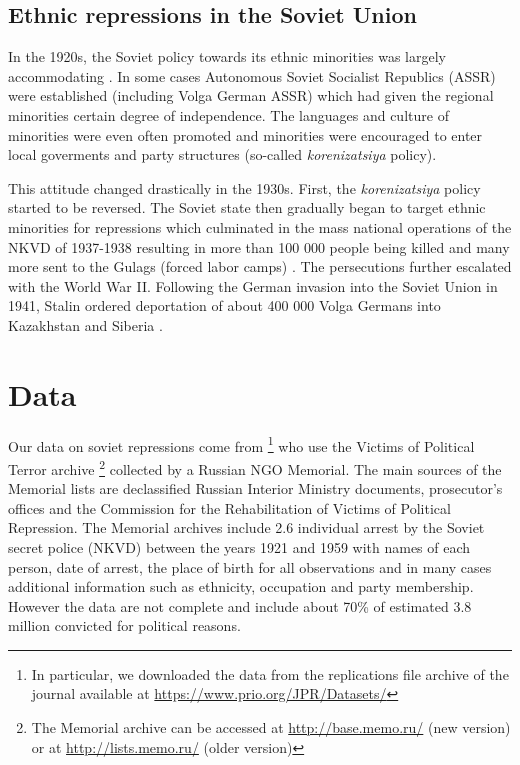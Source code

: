 \documentclass[11pt]{article}
\begin{document}
\subsection{Ethnic repressions in the Soviet Union}
In the 1920s, the Soviet policy towards its ethnic minorities was largely accommodating \citep{martin_affirmative_2001}. In some cases Autonomous Soviet Socialist Republics (ASSR) were established (including Volga German ASSR) which had given the regional minorities certain degree of independence. The languages and culture of minorities were even often promoted and minorities were encouraged to enter local goverments and party structures (so-called \emph{korenizatsiya} policy). 

This attitude changed drastically in the 1930s. First, the  \emph{korenizatsiya} policy started to be reversed. The Soviet state then gradually  began to target ethnic minorities for repressions  which culminated in the mass national operations of the NKVD of 1937-1938 resulting in more than 100 000 people being killed and many more sent to the Gulags (forced labor camps) \citep{snyder_bloodlands:_2011}. 
The persecutions  further escalated with the World War II. Following the German invasion into the Soviet Union in 1941, Stalin ordered deportation of about 400 000 Volga Germans into Kazakhstan and Siberia \citep{polian_against_2003}.
\section{Data}
Our data on soviet repressions come from  \citet{zhukov_stalins_2018}\footnote{In particular, we downloaded the data from the replications file archive of the journal available  at \url{https://www.prio.org/JPR/Datasets/}} who use  the Victims of Political Terror archive \footnote{The Memorial archive can be accessed at \url{http://base.memo.ru/} (new version) or at \url{http://lists.memo.ru/} (older version)} collected by a Russian NGO Memorial. The main sources of the Memorial lists are declassified Russian Interior Ministry documents, prosecutor’s offices and the Commission for the Rehabilitation of Victims of Political Repression.
 The Memorial archives include 2.6 individual arrest by the Soviet secret police (NKVD) between  the years 1921 and 1959 with names of each person, date of arrest, the place of birth for all observations and  in many cases additional information such as ethnicity, occupation and party membership. 
 However the data are not complete and include about 70\% of estimated 3.8 million convicted for political reasons.
\end{document}
